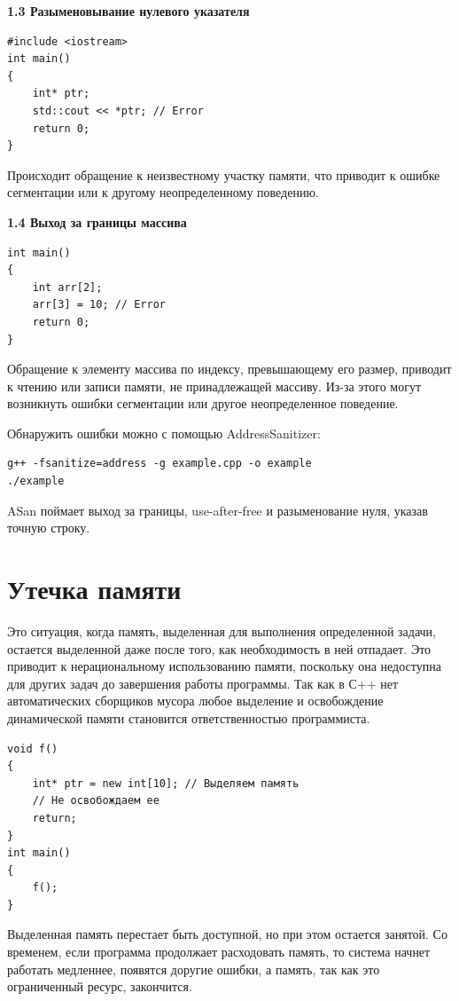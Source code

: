 \documentclass[14pt]{extreport}
\begin{document}
\hspace{0.5cm}

\centerline{\large{\textbf{1.3 Разыменовывание нулевого указателя}}}
\begin{verbatim}
#include <iostream>
int main()
{
    int* ptr;
    std::cout << *ptr; // Error
    return 0;
}
\end{verbatim}
Происходит обращение к неизвестному участку памяти, что приводит к ошибке сегментации или к другому неопределенному поведению. 

\hspace{0.5cm}

\centerline{\large{\textbf{1.4 Выход за границы массива}}}
\begin{verbatim}
int main()
{
    int arr[2];
    arr[3] = 10; // Error
    return 0;
}
\end{verbatim}
Обращение к элементу массива по индексу, превышающему его размер, приводит к чтению или записи памяти, не принадлежащей массиву. Из-за этого могут возникнуть ошибки сегментации или другое неопределенное поведение. 

Обнаружить ошибки можно с помощью AddressSanitizer: 
\begin{verbatim}
g++ -fsanitize=address -g example.cpp -o example
./example
\end{verbatim}
ASan поймает выход за границы, use-after-free и разыменование нуля, указав точную строку.

\newpage
{\centering\section{Утечка памяти}}
Это ситуация, когда память, выделенная для выполнения определенной задачи, остается выделенной даже после того, как необходимость в ней отпадает. Это приводит к нерациональному использованию памяти, поскольку она недоступна для других задач до завершения работы программы.
Так как в С++ нет автоматических сборщиков мусора любое выделение и освобождение динамической памяти становится ответственностью программиста.

\begin{verbatim}
void f() 
{
    int* ptr = new int[10]; // Выделяем память
    // Не освобождаем ее 
    return;
}
int main() 
{
    f();
}
\end{verbatim}
Выделенная память перестает быть доступной, но при этом остается занятой. Со временем, если программа продолжает расходовать память, то система начнет работать медленнее, появятся доругие ошибки, а память, так как это ограниченный ресурс, закончится.
\end{document}
